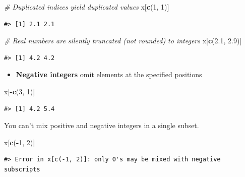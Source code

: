 \documentclass[]{book}
\newenvironment{Shaded}{\begin{snugshade}}{\end{snugshade}}
\newcommand{\KeywordTok}[1]{\textcolor[rgb]{0.13,0.29,0.53}{\textbf{#1}}}
\newcommand{\DecValTok}[1]{\textcolor[rgb]{0.00,0.00,0.81}{#1}}
\newcommand{\FloatTok}[1]{\textcolor[rgb]{0.00,0.00,0.81}{#1}}
\newcommand{\CommentTok}[1]{\textcolor[rgb]{0.56,0.35,0.01}{\textit{#1}}}
\newcommand{\OperatorTok}[1]{\textcolor[rgb]{0.81,0.36,0.00}{\textbf{#1}}}
\newcommand{\NormalTok}[1]{#1}
\providecommand{\tightlist}{%
  \setlength{\itemsep}{0pt}\setlength{\parskip}{0pt}}
\theoremstyle{definition}
\theoremstyle{definition}
\theoremstyle{definition}
\theoremstyle{remark}
\begin{document}
\begin{Shaded}
\begin{Highlighting}[]
\CommentTok{# Duplicated indices yield duplicated values}
\NormalTok{x[}\KeywordTok{c}\NormalTok{(}\DecValTok{1}\NormalTok{, }\DecValTok{1}\NormalTok{)]}
\end{Highlighting}
\end{Shaded}

\begin{verbatim}
#> [1] 2.1 2.1
\end{verbatim}

\begin{Shaded}
\begin{Highlighting}[]
\CommentTok{# Real numbers are silently truncated (not rounded) to integers}
\NormalTok{x[}\KeywordTok{c}\NormalTok{(}\FloatTok{2.1}\NormalTok{, }\FloatTok{2.9}\NormalTok{)]}
\end{Highlighting}
\end{Shaded}

\begin{verbatim}
#> [1] 4.2 4.2
\end{verbatim}

\begin{itemize}
\tightlist
\item
  \textbf{Negative integers} omit elements at the specified positions
\end{itemize}

\begin{Shaded}
\begin{Highlighting}[]
\NormalTok{x[}\OperatorTok{-}\KeywordTok{c}\NormalTok{(}\DecValTok{3}\NormalTok{, }\DecValTok{1}\NormalTok{)]}
\end{Highlighting}
\end{Shaded}

\begin{verbatim}
#> [1] 4.2 5.4
\end{verbatim}

You can't mix positive and negative integers in a single subset.

\begin{Shaded}
\begin{Highlighting}[]
\NormalTok{x[}\KeywordTok{c}\NormalTok{(}\OperatorTok{-}\DecValTok{1}\NormalTok{, }\DecValTok{2}\NormalTok{)]}
\end{Highlighting}
\end{Shaded}

\begin{verbatim}
#> Error in x[c(-1, 2)]: only 0's may be mixed with negative subscripts
\end{verbatim}
\end{document}
